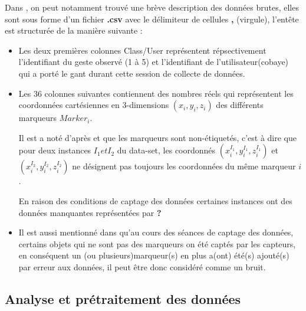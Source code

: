 \par 
Dans \cite{dataset}, on peut notamment trouvé une brève description des données brutes, elles sont sous forme d'un fichier \textbf{.csv} avec le délimiteur de cellules \textbf{,} (virgule), l'entête est structurée  de la manière suivante :
\begin{itemize}
	\item Les deux premières colonnes Class/User représentent répsectivement l'identifiant du geste observé (1 à 5) et l'identifiant de l'utilisateur(cobaye) qui a porté le gant durant cette session de collecte de données.
	\item Les 36 colonnes suivantes contiennent des nombres réels qui représentent les coordonnées cartésiennes en 3-dimensions $(x_i,y_i,z_i)$ des différents marqueurs $Marker_i$. \par Il est a noté d'après \cite{datasetDetails} et \cite{dataset} que les marqueurs sont non-étiquetés, c'est à dire que pour deux instances $I_1 et I_2$ du data-set, les coordonnés $(x_i^{I_1},y_i^{I_1},z_i^{I_1})$ et $(x_i^{I_2},y_i^{I_2},z_i^{I_2})$ ne désignent pas toujours les coordonnées du même marqueur $i$. \par En raison des conditions de captage des données certaines instances ont des données manquantes représentées par \textbf{?}
	\item Il est aussi mentionné dans \cite{datasetDetails} qu'au cours des séances de captage des données, certains objets qui ne sont pas des marqueurs on été captés par les capteurs, en conséquent un (ou plusieurs)marqueur(s) en plus a(ont) été(s) ajouté(s) par erreur aux données, il peut être donc considéré comme un bruit.\label{noise}
\end{itemize}
\subsection{Analyse et prétraitement des données}\label{dataAnalysis}
